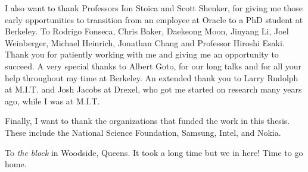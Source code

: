 \documentclass{ucbthesis}
\begin{document}
\begin{frontmatter}
\begin{acknowledgements}
I also want to thank Professors Ion Stoica and Scott Shenker, for giving me those early opportunities to transition from an employee
at Oracle to a PhD student at Berkeley. To Rodrigo Fonseca, Chris Baker, Daekeong Moon, Jinyang Li, Joel Weinberger,
Michael Heinrich, Jonathan Chang and
Professor Hiroshi Esaki.  Thank you for patiently working with me and giving me an opportunity to succeed.  
A very special thanks to Albert Goto, for our long talks and for all your help throughout my time at Berkeley.  
An extended
thank you to Larry Rudolph at M.I.T. and Josh Jacobs at Drexel, who got me started on research many years ago, while I was at M.I.T.

Finally, I want to thank the organizations that funded the work in this thesis.  These include the National Science Foundation,
Samsung, Intel, and Nokia.

To \emph{the block} in Woodside, Queens.  
It took a long time but we in here!  Time to go home.








\end{acknowledgements}

\end{frontmatter}

\pagestyle{headings}




















\appendix


\printbibliography
\end{document}
